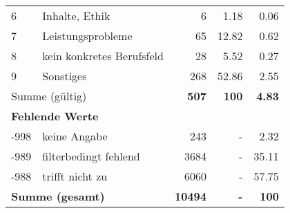 \begin{longtable}{lXrrr}
     6 &
     \multicolumn{1}{X}{ Inhalte, Ethik   } &


       \num{6} &
       \num[round-mode=places,round-precision=2]{1,18} &
         \num[round-mode=places,round-precision=2]{0,06} \\

     7 &
     \multicolumn{1}{X}{ Leistungsprobleme   } &


       \num{65} &
       \num[round-mode=places,round-precision=2]{12,82} &
         \num[round-mode=places,round-precision=2]{0,62} \\

     8 &
     \multicolumn{1}{X}{ kein konkretes Berufsfeld   } &


       \num{28} &
       \num[round-mode=places,round-precision=2]{5,52} &
         \num[round-mode=places,round-precision=2]{0,27} \\

     9 &
     \multicolumn{1}{X}{ Sonstiges   } &


       \num{268} &
       \num[round-mode=places,round-precision=2]{52,86} &
         \num[round-mode=places,round-precision=2]{2,55} \\
     \midrule
     \multicolumn{2}{l}{Summe (gültig)} &
       \textbf{\num{507}} &
     \textbf{100} &
       \textbf{\num[round-mode=places,round-precision=2]{4,83}} \\
     \multicolumn{5}{l}{\textbf{Fehlende Werte}}\\
       -998 &
       keine Angabe &
         \num{243} &
        - &
         \num[round-mode=places,round-precision=2]{2,32} \\
       -989 &
       filterbedingt fehlend &
         \num{3684} &
        - &
         \num[round-mode=places,round-precision=2]{35,11} \\
       -988 &
       trifft nicht zu &
         \num{6060} &
        - &
         \num[round-mode=places,round-precision=2]{57,75} \\
     \midrule
     \multicolumn{2}{l}{\textbf{Summe (gesamt)}} &
          \textbf{\num{10494}} &
        \textbf{-} &
        \textbf{100} \\
     \bottomrule
     \end{longtable}
     
